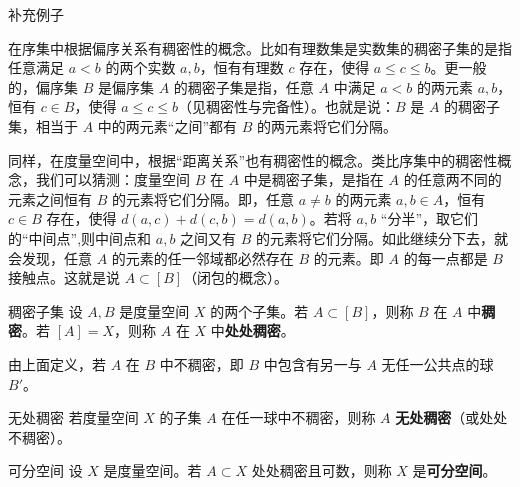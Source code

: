 
\begin{issues}
补充例子
\end{issues}

在序集中根据偏序关系有稠密性的概念。比如有理数集是实数集的稠密子集的是指任意满足 $a<b$ 的两个实数 $a,b$，恒有有理数 $c$ 存在，使得 $a\leq c\leq b$。更一般的，偏序集 $B$ 是偏序集 $A$ 的稠密子集是指，任意 $A$ 中满足 $a<b$ 的两元素 $a,b$，恒有 $c\in B$，使得 $a\leq c\leq b$（见稠密性与完备性）。也就是说：$B$ 是 $A$ 的稠密子集，相当于 $A$ 中的两元素“之间”都有 $B$ 的两元素将它们分隔。

同样，在度量空间中，根据“距离关系”也有稠密性的概念。类比序集中的稠密性概念，我们可以猜测：度量空间 $B$ 在 $A$ 中是稠密子集，是指在 $A$ 的任意两不同的元素之间恒有 $B$ 的元素将它们分隔。即，任意 $a\neq b$ 的两元素 $a,b\in A$，恒有 $c\in B$ 存在，使得 $d(a,c)+d(c,b)=d(a,b)$。若将 $a,b$ “分半”，取它们的“中间点”,则中间点和 $a,b$ 之间又有 $B$ 的元素将它们分隔。如此继续分下去，就会发现，任意 $A$ 的元素的任一邻域都必然存在 $B$ 的元素。即 $A$ 的每一点都是 $B$ 接触点。这就是说 $A\subset [B]$（闭包的概念）。

\begin{definition}{稠密子集}
设 $A,B$ 是度量空间 $X$ 的两个子集。若 $A\subset [B]$，则称 $B$ 在 $A$ 中\textbf{稠密}。若 $[A]=X$，则称 $A$ 在 $X$ 中\textbf{处处稠密}。
\end{definition}

由上面定义，若 $A$ 在 $B$ 中不稠密，即 $B$ 中包含有另一与 $A$ 无任一公共点的球 $B'$。
\begin{definition}{无处稠密}
若度量空间 $X$ 的子集 $A$ 在任一球中不稠密，则称 $A$ \textbf{无处稠密}（或处处不稠密）。
\end{definition}

\begin{definition}{可分空间}
设 $X$ 是度量空间。若 $A\subset X$ 处处稠密且可数，则称 $X$ 是\textbf{可分空间}。
\end{definition}



